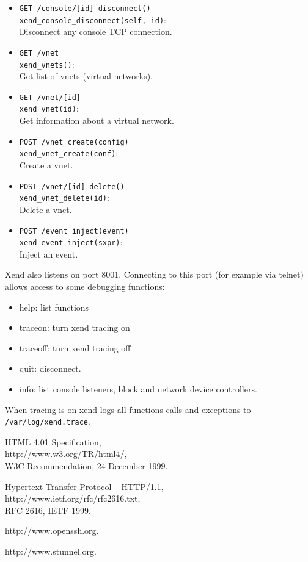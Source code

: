 \documentclass[11pt,twoside,final,openright]{xenstyle}
\begin{document}
\begin{itemize}
\item {\tt GET /console/[id] disconnect()}\\
  {\tt xend\_console\_disconnect(self, id)}:\\
  Disconnect any console TCP connection.

\item {\tt GET /vnet}\\
  {\tt xend\_vnets()}:\\
  Get list of vnets (virtual networks).

\item {\tt GET /vnet/[id]}\\
  {\tt xend\_vnet(id)}:\\
  Get information about a virtual network.

\item {\tt POST /vnet create(config)}\\
  {\tt xend\_vnet\_create(conf)}:\\
  Create a vnet.

\item {\tt POST /vnet/[id] delete()}\\
  {\tt xend\_vnet\_delete(id)}:\\
  Delete a vnet.

\item {\tt POST /event inject(event)}\\
  {\tt xend\_event\_inject(sxpr)}:\\
  Inject an event.

\end{itemize}

Xend also listens on port 8001. Connecting to this port (for example via telnet)
allows access to some debugging functions:
\begin{itemize}
\item help: list functions
\item traceon: turn xend tracing on
\item traceoff: turn xend tracing off
\item quit: disconnect.
\item info: list console listeners, block and network device controllers.
\end{itemize}

When tracing is on xend logs all functions calls and exceptions to
{\tt /var/log/xend.trace}.

\begin{thebibliography}{99}

HTML 4.01 Specification,\\
http://www.w3.org/TR/html4/,\\
W3C Recommendation, 24 December 1999.

Hypertext Transfer Protocol -- HTTP/1.1,\\
http://www.ietf.org/rfc/rfc2616.txt,\\
RFC 2616, IETF 1999.

http://www.openssh.org.

http://www.stunnel.org.

\end{thebibliography}
\end{document}

